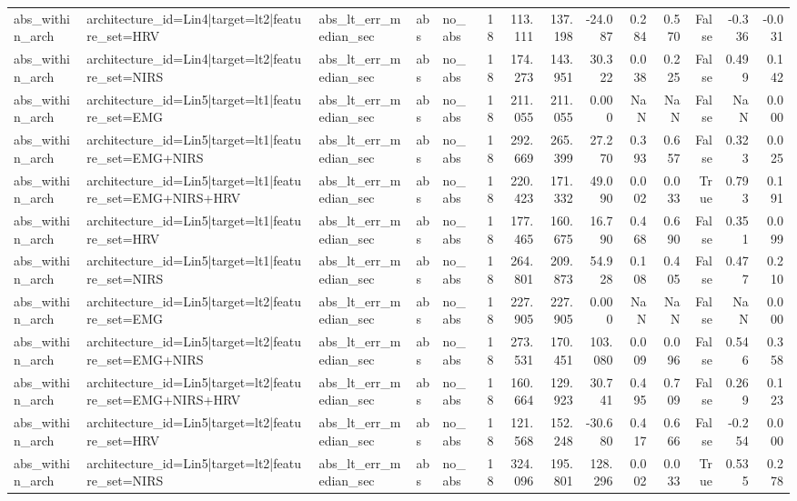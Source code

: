 \begin{table}
\begin{tabular}{lllllrrrrrrrrr}
abs_within_arch & architecture_id=Lin4|target=lt2|feature_set=HRV & abs_lt_err_median_sec & abs & no_abs & 18 & 113.111 & 137.198 & -24.087 & 0.284 & 0.570 & False & -0.336 & -0.031 \\
abs_within_arch & architecture_id=Lin4|target=lt2|feature_set=NIRS & abs_lt_err_median_sec & abs & no_abs & 18 & 174.273 & 143.951 & 30.322 & 0.038 & 0.225 & False & 0.499 & 0.142 \\
abs_within_arch & architecture_id=Lin5|target=lt1|feature_set=EMG & abs_lt_err_median_sec & abs & no_abs & 18 & 211.055 & 211.055 & 0.000 & NaN & NaN & False & NaN & 0.000 \\
abs_within_arch & architecture_id=Lin5|target=lt1|feature_set=EMG+NIRS & abs_lt_err_median_sec & abs & no_abs & 18 & 292.669 & 265.399 & 27.270 & 0.393 & 0.657 & False & 0.323 & 0.025 \\
abs_within_arch & architecture_id=Lin5|target=lt1|feature_set=EMG+NIRS+HRV & abs_lt_err_median_sec & abs & no_abs & 18 & 220.423 & 171.332 & 49.090 & 0.002 & 0.033 & True & 0.793 & 0.191 \\
abs_within_arch & architecture_id=Lin5|target=lt1|feature_set=HRV & abs_lt_err_median_sec & abs & no_abs & 18 & 177.465 & 160.675 & 16.790 & 0.468 & 0.690 & False & 0.351 & 0.099 \\
abs_within_arch & architecture_id=Lin5|target=lt1|feature_set=NIRS & abs_lt_err_median_sec & abs & no_abs & 18 & 264.801 & 209.873 & 54.928 & 0.108 & 0.405 & False & 0.477 & 0.210 \\
abs_within_arch & architecture_id=Lin5|target=lt2|feature_set=EMG & abs_lt_err_median_sec & abs & no_abs & 18 & 227.905 & 227.905 & 0.000 & NaN & NaN & False & NaN & 0.000 \\
abs_within_arch & architecture_id=Lin5|target=lt2|feature_set=EMG+NIRS & abs_lt_err_median_sec & abs & no_abs & 18 & 273.531 & 170.451 & 103.080 & 0.009 & 0.096 & False & 0.546 & 0.358 \\
abs_within_arch & architecture_id=Lin5|target=lt2|feature_set=EMG+NIRS+HRV & abs_lt_err_median_sec & abs & no_abs & 18 & 160.664 & 129.923 & 30.741 & 0.495 & 0.709 & False & 0.269 & 0.123 \\
abs_within_arch & architecture_id=Lin5|target=lt2|feature_set=HRV & abs_lt_err_median_sec & abs & no_abs & 18 & 121.568 & 152.248 & -30.680 & 0.417 & 0.666 & False & -0.254 & 0.000 \\
abs_within_arch & architecture_id=Lin5|target=lt2|feature_set=NIRS & abs_lt_err_median_sec & abs & no_abs & 18 & 324.096 & 195.801 & 128.296 & 0.002 & 0.033 & True & 0.535 & 0.278 \\

\end{tabular}
\end{table}
